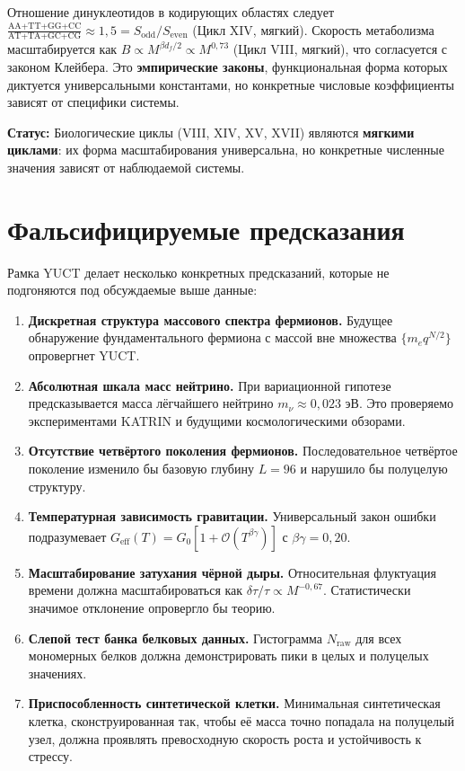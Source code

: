 \documentclass[12pt,a4paper]{article}
\begin{document}
	Отношение динуклеотидов в кодирующих областях следует \(\frac{\text{AA+TT+GG+CC}}{\text{AT+TA+GC+CG}} \approx 1,5 = S_{\mathrm{odd}}/S_{\mathrm{even}}\) (Цикл XIV, мягкий). Скорость метаболизма масштабируется как \(B \propto M^{\beta d_f/2} \propto M^{0,73}\) (Цикл VIII, мягкий), что согласуется с законом Клейбера. Это \textbf{эмпирические законы}, функциональная форма которых диктуется универсальными константами, но конкретные числовые коэффициенты зависят от специфики системы.
	
	\textbf{Статус:} Биологические циклы (VIII, XIV, XV, XVII) являются \textbf{мягкими циклами}: их форма масштабирования универсальна, но конкретные численные значения зависят от наблюдаемой системы.
	
	\section{Фальсифицируемые предсказания}
	\label{sec:predictions}
	
	Рамка YUCT делает несколько конкретных предсказаний, которые не подгоняются под обсуждаемые выше данные:
	
	\begin{enumerate}
		\item \textbf{Дискретная структура массового спектра фермионов.} Будущее обнаружение фундаментального фермиона с массой вне множества \(\{m_e q^{N/2}\}\) опровергнет YUCT.
		\item \textbf{Абсолютная шкала масс нейтрино.} При вариационной гипотезе предсказывается масса лёгчайшего нейтрино \(m_{\nu} \approx 0,023\) эВ. Это проверяемо экспериментами KATRIN и будущими космологическими обзорами.
		\item \textbf{Отсутствие четвёртого поколения фермионов.} Последовательное четвёртое поколение изменило бы базовую глубину \(L = 96\) и нарушило бы полуцелую структуру.
		\item \textbf{Температурная зависимость гравитации.} Универсальный закон ошибки подразумевает \(G_{\mathrm{eff}}(T) = G_0[1 + \mathcal{O}(T^{\beta\gamma})]\) с \(\beta\gamma = 0,20\).
		\item \textbf{Масштабирование затухания чёрной дыры.} Относительная флуктуация времени должна масштабироваться как \(\delta\tau/\tau \propto M^{-0,67}\). Статистически значимое отклонение опровергло бы теорию.
		\item \textbf{Слепой тест банка белковых данных.} Гистограмма \(N_{\mathrm{raw}}\) для всех мономерных белков должна демонстрировать пики в целых и полуцелых значениях.
		\item \textbf{Приспособленность синтетической клетки.} Минимальная синтетическая клетка, сконструированная так, чтобы её масса точно попадала на полуцелый узел, должна проявлять превосходную скорость роста и устойчивость к стрессу.
	\end{enumerate}
	
\end{document}
